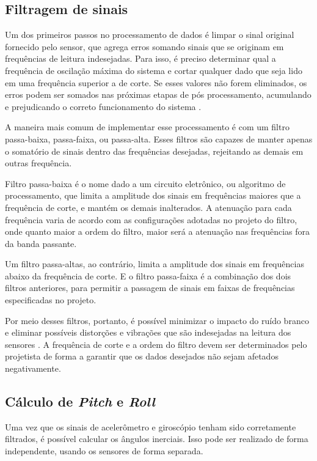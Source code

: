 \subsection{Filtragem de sinais}

Um dos primeiros passos no processamento de dados é limpar o sinal original fornecido pelo sensor, que agrega erros somando sinais que se originam em frequências de leitura indesejadas. Para isso, é preciso determinar qual a frequência de oscilação máxima do sistema e cortar qualquer dado que seja lido em uma frequência superior a de corte. Se esses valores não forem eliminados, os erros podem ser somados nas próximas etapas de pós processamento, acumulando e prejudicando o correto funcionamento do sistema \cite{article:Yang2017}.

A maneira mais comum de implementar esse processamento é com um filtro passa-baixa, passa-faixa, ou passa-alta. Esses filtros são capazes de manter apenas o somatório de sinais dentro das frequências desejadas, rejeitando as demais em outras frequência. 

Filtro passa-baixa é o nome dado a um circuito eletrônico, ou algoritmo de processamento, que limita a amplitude dos sinais em frequências maiores que a frequência de corte, e mantém os demais inalterados. A atenuação para cada frequência varia de acordo com as configurações adotadas no projeto do filtro, onde quanto maior a ordem do filtro, maior será a atenuação nas frequências fora da banda passante. 

Um filtro passa-altas, ao contrário, limita a amplitude dos sinais em frequências abaixo da frequência de corte. E o filtro passa-faixa é a combinação dos dois filtros anteriores, para permitir a passagem de sinais em faixas de frequências especificadas no projeto.

Por meio desses filtros, portanto, é possível minimizar o impacto do ruído branco e eliminar possíveis distorções e vibrações que são indesejadas na leitura dos sensores \cite{article:Yang2017}. A frequência de corte e a ordem do filtro devem ser determinados pelo projetista de forma a garantir que os dados desejados não sejam afetados negativamente. 

\subsection{Cálculo de \textit{Pitch} e \textit{Roll}}
\label{sec:calcPitchRoll}
Uma vez que os sinais de acelerômetro e giroscópio tenham sido corretamente filtrados, é possível calcular os ângulos inerciais. Isso pode ser realizado de forma independente, usando os sensores de forma separada.

